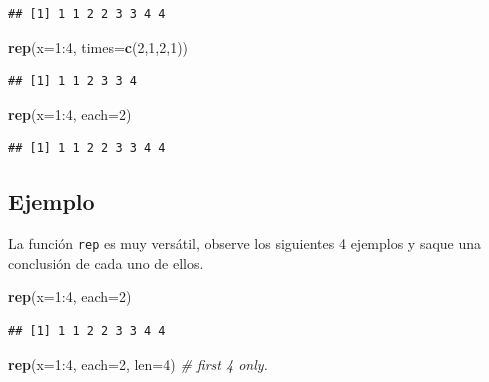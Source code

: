 \documentclass[10pt,]{krantz}
\makeatletter
\newenvironment{Shaded}{\begin{snugshade}}{\end{snugshade}}
\newcommand{\KeywordTok}[1]{\textcolor[rgb]{0.13,0.29,0.53}{\textbf{{#1}}}}
\newcommand{\DataTypeTok}[1]{\textcolor[rgb]{0.13,0.29,0.53}{{#1}}}
\newcommand{\DecValTok}[1]{\textcolor[rgb]{0.00,0.00,0.81}{{#1}}}
\newcommand{\CommentTok}[1]{\textcolor[rgb]{0.56,0.35,0.01}{\textit{{#1}}}}
\newcommand{\NormalTok}[1]{{#1}}
\newenvironment{kframe}{%
\medskip{}
\setlength{\fboxsep}{.8em}
 \def\at@end@of@kframe{}%
 \ifinner\ifhmode%
  \def\at@end@of@kframe{\end{minipage}}%
  \begin{minipage}{\columnwidth}%
 \fi\fi%
 \def\FrameCommand##1{\hskip\@totalleftmargin \hskip-\fboxsep
 \colorbox{shadecolor}{##1}\hskip-\fboxsep
     \hskip-\linewidth \hskip-\@totalleftmargin \hskip\columnwidth}%
 \MakeFramed {\advance\hsize-\width
   \@totalleftmargin\z@ \linewidth\hsize
   \@setminipage}}%
 {\par\unskip\endMakeFramed%
 \at@end@of@kframe}
\renewenvironment{Shaded}{\begin{kframe}}{\end{kframe}}
\makeatother
\begin{document}
\begin{verbatim}
## [1] 1 1 2 2 3 3 4 4
\end{verbatim}

\begin{Shaded}
\begin{Highlighting}[]
\KeywordTok{rep}\NormalTok{(}\DataTypeTok{x=}\DecValTok{1}\NormalTok{:}\DecValTok{4}\NormalTok{, }\DataTypeTok{times=}\KeywordTok{c}\NormalTok{(}\DecValTok{2}\NormalTok{,}\DecValTok{1}\NormalTok{,}\DecValTok{2}\NormalTok{,}\DecValTok{1}\NormalTok{))}
\end{Highlighting}
\end{Shaded}

\begin{verbatim}
## [1] 1 1 2 3 3 4
\end{verbatim}

\begin{Shaded}
\begin{Highlighting}[]
\KeywordTok{rep}\NormalTok{(}\DataTypeTok{x=}\DecValTok{1}\NormalTok{:}\DecValTok{4}\NormalTok{, }\DataTypeTok{each=}\DecValTok{2}\NormalTok{)}
\end{Highlighting}
\end{Shaded}

\begin{verbatim}
## [1] 1 1 2 2 3 3 4 4
\end{verbatim}

\subsection*{Ejemplo}\label{ejemplo-5}


La función \texttt{rep} es muy versátil, observe los siguientes 4
ejemplos y saque una conclusión de cada uno de ellos.

\begin{Shaded}
\begin{Highlighting}[]
\KeywordTok{rep}\NormalTok{(}\DataTypeTok{x=}\DecValTok{1}\NormalTok{:}\DecValTok{4}\NormalTok{, }\DataTypeTok{each=}\DecValTok{2}\NormalTok{)}
\end{Highlighting}
\end{Shaded}

\begin{verbatim}
## [1] 1 1 2 2 3 3 4 4
\end{verbatim}

\begin{Shaded}
\begin{Highlighting}[]
\KeywordTok{rep}\NormalTok{(}\DataTypeTok{x=}\DecValTok{1}\NormalTok{:}\DecValTok{4}\NormalTok{, }\DataTypeTok{each=}\DecValTok{2}\NormalTok{, }\DataTypeTok{len=}\DecValTok{4}\NormalTok{)    }\CommentTok{# first 4 only.}
\end{Highlighting}
\end{Shaded}
\end{document}
